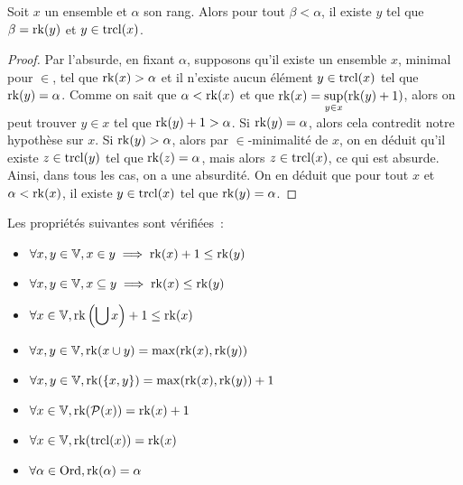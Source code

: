 \begin{lemma}\label{lem.rk.surj}
  Soit $x$ un ensemble et $\alpha$ son rang. Alors pour tout $\beta < \alpha$,
  il existe $y$ tel que $\beta = \operatorname{rk}(y)$ et $y \in \operatorname{trcl}(x)$.
\end{lemma}

\begin{proof}
  Par l'absurde, en fixant $\alpha$, supposons qu'il existe un ensemble $x$,
  minimal pour $\in$, tel que $\operatorname{rk}(x) > \alpha$ et il n'existe aucun élément
  $y\in\operatorname{trcl}(x)$ tel que $\operatorname{rk}(y) = \alpha$. Comme on sait que $\alpha < \operatorname{rk}(x)$
  et que $\displaystyle \operatorname{rk}(x) = \sup_{y \in x} (\operatorname{rk}(y) + 1)$,
  alors on peut trouver $y \in x$ tel que $\operatorname{rk}(y) + 1 > \alpha$. Si
  $\operatorname{rk}(y) = \alpha$, alors cela contredit notre hypothèse sur $x$. Si
  $\operatorname{rk}(y) > \alpha$, alors par $\in$-minimalité de $x$, on en déduit qu'il
  existe $z \in \operatorname{trcl}(y)$ tel que $\operatorname{rk}(z) = \alpha$, mais alors
  $z \in \operatorname{trcl}(x)$, ce qui est absurde. Ainsi, dans tous les cas, on a une
  absurdité. On en déduit que pour tout $x$ et $\alpha < \operatorname{rk}(x)$, il existe
  $y \in \operatorname{trcl}(x)$ tel que $\operatorname{rk}(y) = \alpha$.
\end{proof}

\begin{property}\label{prop.rg.oper}
  Les propriétés suivantes sont vérifiées~:
  \begin{itemize}
  \item $\forall x,y\in\mathbb V, x\in y \implies \operatorname{rk}(x) + 1 \leq \operatorname{rk}(y)$
  \item $\forall x,y\in\mathbb V, x\subseteq y \implies \operatorname{rk}(x) \leq \operatorname{rk}(y)$
  \item $\displaystyle \forall x\in\mathbb V,
    \operatorname{rk}\left(\bigcup x\right) + 1 \leq \operatorname{rk}(x)$
  \item $\forall x,y\in\mathbb V, \operatorname{rk}(x\cup y) = \max(\operatorname{rk}(x),\operatorname{rk}(y))$
  \item $\forall x,y\in\mathbb V, \operatorname{rk}(\{x,y\}) = \max(\operatorname{rk}(x),\operatorname{rk}(y)) + 1$
  \item $\forall x\in\mathbb V, \operatorname{rk}(\mathcal{P}(x)) = \operatorname{rk}(x) + 1$
  \item $\forall x\in\mathbb V, \operatorname{rk}(\operatorname{trcl}(x)) = \operatorname{rk}(x)$
  \item $\displaystyle \forall \alpha \in \operatorname{Ord}, \operatorname{rk}(\alpha) = \alpha$
  \end{itemize}
\end{property}

